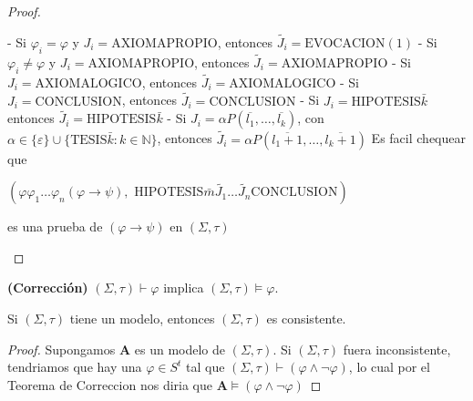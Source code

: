 \begin{proof}
\begin{enumerate}
      - Si $\varphi_{i}=\varphi $ y $J_{i}=\mathrm{AXIOMAPROPIO}$, entonces $\widetilde{J_{i}}=\mathrm{EVOCACION}(1)$
      - Si $\varphi_{i}\neq \varphi $ y $J_{i}=\mathrm{AXIOMAPROPIO}$, entonces $\widetilde{J_{i}}=\mathrm{AXIOMAPROPIO}$
      - Si $J_{i}=\mathrm{AXIOMALOGICO}$, entonces $\widetilde{J_{i}}= \mathrm{AXIOMALOGICO}$
      - Si $J_{i}=\mathrm{CONCLUSION}$, entonces $\widetilde{J_{i}}=\mathrm{ CONCLUSION}$
      - Si $J_{i}=\mathrm{HIPOTESIS}\bar{k}$ entonces $\widetilde{J_{i}}= \mathrm{HIPOTESIS}\bar{k}$
      - Si $J_{i}=\alpha P(\overline{l_{1}}, \dotsc, \overline{l_{k}})$, con $ \alpha \in \{\varepsilon \}\cup \{\mathrm{TESIS}\bar{k}:k\in \mathbb{N}\}$, entonces $\widetilde{J_{i}}=\alpha P(\overline{l_{1}+1}, \dotsc, \overline{l_{k}+1 })$
      Es facil chequear que

      $\displaystyle (\varphi \varphi_{1}\dotsc\varphi_{n}(\varphi \rightarrow \psi ),\text{ HIPOTESIS}\bar{m}\widetilde{J_{1}}\dotsc\widetilde{J_{n}}\text{CONCLUSION}) $

      es una prueba de $(\varphi \rightarrow \psi )$ en $(\Sigma, \tau)$
    \end{enumerate}
  \end{proof}

  \begin{theorem}
    \PN \textbf{(Corrección)} $(\Sigma, \tau) \vdash \varphi$ implica $(\Sigma, \tau) \models \varphi$.
  \end{theorem}

  \begin{corollary}
    \PN Si $(\Sigma, \tau)$ tiene un modelo, entonces $(\Sigma, \tau)$ es consistente.
  \end{corollary}
  \begin{proof}
    Supongamos $\mathbf{A}$ es un modelo de $(\Sigma, \tau).$ Si $(\Sigma, \tau)$ fuera inconsistente, tendriamos que hay una $\varphi \in S^{t}$ tal que $ (\Sigma, \tau)\vdash (\varphi \wedge \lnot \varphi )$, lo cual por el Teorema de Correccion nos diria que $\mathbf{A}\models (\varphi \wedge \lnot \varphi )$
  \end{proof}

